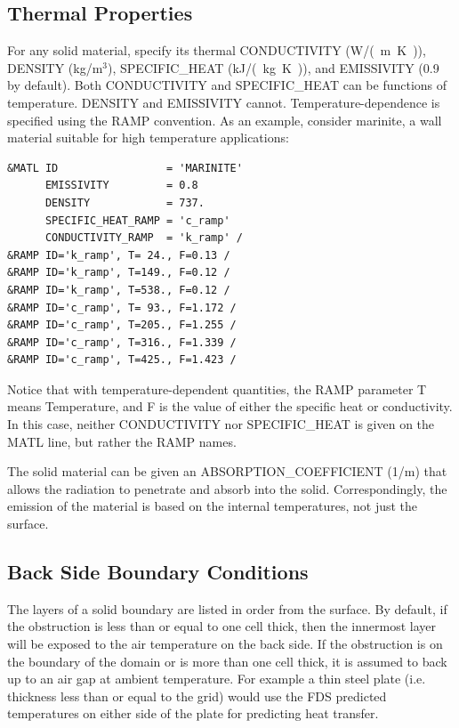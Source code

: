 \documentclass[11pt]{book}
\begin{document}
\subsection{Thermal Properties}

\label{info:thermal_properties}

For any solid material, specify its thermal
{\ct CONDUCTIVITY} (\si{W/(m.K)}), {\ct DENSITY} (kg/m$^3$),
{\ct SPECIFIC\_HEAT} (\si{kJ/(kg.K)}), and {\ct EMISSIVITY} (0.9 by default).
Both {\ct CONDUCTIVITY} and {\ct SPECIFIC\_HEAT} can be functions of
temperature. {\ct DENSITY} and {\ct EMISSIVITY} cannot.
Temperature-dependence is specified using the {\ct RAMP} convention.
As an example, consider marinite, a wall material suitable for high temperature applications:

\begin{lstlisting}
&MATL ID                 = 'MARINITE'
      EMISSIVITY         = 0.8
      DENSITY            = 737.
      SPECIFIC_HEAT_RAMP = 'c_ramp'
      CONDUCTIVITY_RAMP  = 'k_ramp' /
&RAMP ID='k_ramp', T= 24., F=0.13 /
&RAMP ID='k_ramp', T=149., F=0.12 /
&RAMP ID='k_ramp', T=538., F=0.12 /
&RAMP ID='c_ramp', T= 93., F=1.172 /
&RAMP ID='c_ramp', T=205., F=1.255 /
&RAMP ID='c_ramp', T=316., F=1.339 /
&RAMP ID='c_ramp', T=425., F=1.423 /
\end{lstlisting}
Notice that with temperature-dependent quantities, the {\ct RAMP} parameter
{\ct T} means Temperature, and {\ct F} is the value of either
the specific heat or conductivity. In this case, neither {\ct CONDUCTIVITY} nor {\ct SPECIFIC\_HEAT} is given on the
{\ct MATL} line, but rather the {\ct RAMP} names.

The solid
material can be given an {\ct ABSORPTION\_COEFFICIENT} (1/m) that allows
the radiation to penetrate and absorb into the solid. Correspondingly,
the emission of the material is based on the internal temperatures,
not just the surface.




\subsection{Back Side Boundary Conditions}
\label{info:BACKING}

The layers of a solid boundary are listed in order from the surface. By default,
if the obstruction is less than or equal to one cell thick, then the innermost layer will be exposed to the air temperature on the back side.  If the obstruction is on the boundary of the domain or is more than one cell thick, it is assumed to back up to an air gap at ambient
temperature. For example a thin steel plate (i.e. thickness less than or equal to the grid) would use the FDS predicted temperatures on either side of the plate for predicting heat transfer.
\end{document}
